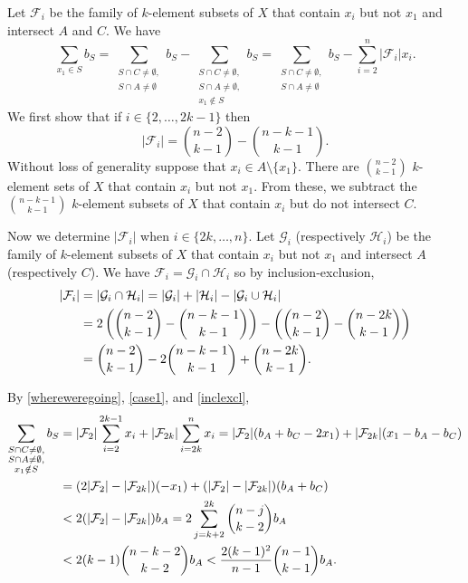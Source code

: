 \documentclass[12pt]{article}
\newcommand\cF{{\mathcal F}}
\newcommand\cG{{\mathcal G}}
\newcommand\cH{{\mathcal H}}
\theoremstyle{plain}
{\theorembodyfont{\slshape}
\newtheorem{theorem}{Theorem}[section]
\newtheorem{lemma}[theorem]{Lemma}
\newtheorem{corollary}[theorem]{Corollary}}
\begin{document}
Let $\cF_{i}$ be the family of $k$-element subsets of $X$ that contain $x_{i}$ but not $x_{1}$ and intersect $A$ and $C$. We have
\begin{equation}
\label{whereweregoing}
\sum_{x_{1} \in S} b_{S} = \sum_{\substack{S \cap C \neq \emptyset, \\ S \cap A \neq \emptyset}} b_{S} - \sum_{\substack{S \cap C \neq \emptyset, \\ S \cap A \neq \emptyset, \\ x_{1} \notin S}} b_{S} = \sum_{\substack{S \cap C \neq \emptyset, \\ S \cap A \neq \emptyset}} b_{S} - \sum_{i=2}^{n} |\cF_{i}|x_{i}.
\end{equation}
We first show that if $i \in \{2, \ldots, 2k-1\}$ then
\begin{equation}
\label{case1}
|\cF_{i}| = \binom{n-2}{k-1} - \binom{n-k-1}{k-1}.
\end{equation}
Without loss of generality suppose that $x_{i} \in A \setminus \{x_{1}\}$. There are $\binom{n-2}{k-1}$ $k$-element sets of $X$ that contain $x_{i}$ but not $x_{1}$. From these, we subtract the $\binom{n-k-1}{k-1}$ $k$-element subsets of $X$ that contain $x_{i}$ but do not intersect $C$.

Now we determine $|\cF_{i}|$ when $i \in \{2k, \ldots, n\}$. Let $\mathcal{G}_{i}$ (respectively $\cH_{i}$) be the family of $k$-element subsets of $X$ that contain $x_{i}$ but not $x_{1}$ and intersect $A$ (respectively $C$). We have $\cF_{i} = \cG_{i} \cap \cH_{i}$ so by inclusion-exclusion,
\begin{align}
\label{inclexcl}
| \cF_{i} | &= |\cG_{i} \cap \cH_{i}| = |\cG_{i}| + |\cH_{i}| - |\cG_{i} \cup \cH_{i}| \notag \\
&= 2 \left( \binom{n-2}{k-1} - \binom{n-k-1}{k-1} \right) - \left( \binom{n-2}{k-1} - \binom{n-2k}{k-1} \right) \notag \\
&= \binom{n-2}{k-1} - 2 \binom{n-k-1}{k-1} + \binom{n-2k}{k-1}.
\end{align}

By \eqref{whereweregoing}, \eqref{case1}, and \eqref{inclexcl},
\begin{align}
\label{evenmorebetter}
\sum_{\substack{S \cap C \neq \emptyset, \\ S \cap A \neq \emptyset, \\ x_{1} \notin S}} b_{S} &= |\cF_{2}| \sum_{i=2}^{2k-1} x_{i} + |\cF_{2k}| \sum_{i=2k}^{n} x_{i} = |\cF_{2}|(b_{A} + b_{C} - 2x_{1}) + |\cF_{2k}|(x_{1} - b_{A} - b_{C}) \notag \\
&= (2|\cF_{2}| - |\cF_{2k}|)(-x_{1}) + (|\cF_{2}| - |\cF_{2k}|)(b_{A} + b_{C}) \notag \\
&< 2(|\cF_{2}| - |\cF_{2k}|)b_{A} = 2 \sum_{j=k+2}^{2k} \binom{n-j}{k-2} b_{A} \notag \\
&< 2(k-1) \binom{n-k-2}{k-2}b_{A} < \frac{2(k-1)^{2}}{n-1} \binom{n-1}{k-1} b_{A}.
\end{align}
\end{document}
